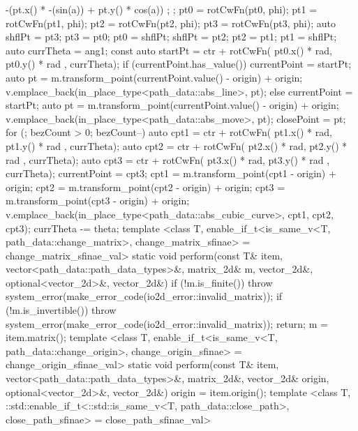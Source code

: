 \begin{codeblock}
{{{{{{              -(pt.x() * -(sin(a)) + pt.y() * cos(a)) };
          };
          pt0 = rotCwFn(pt0, phi);
          pt1 = rotCwFn(pt1, phi);
          pt2 = rotCwFn(pt2, phi);
          pt3 = rotCwFn(pt3, phi);
          auto shflPt = pt3;
          pt3 = pt0;
          pt0 = shflPt;
          shflPt = pt2;
          pt2 = pt1;
          pt1 = shflPt;
          auto currTheta = ang1;
          const auto startPt =
            ctr + rotCwFn({ pt0.x() * rad, pt0.y() * rad }, currTheta);
          if (currentPoint.has_value()) {
            currentPoint = startPt;
            auto pt = m.transform_point(currentPoint.value() - origin) + origin;
            v.emplace_back(in_place_type<path_data::abs_line>, pt);
          }
          else {
            currentPoint = startPt;
            auto pt = m.transform_point(currentPoint.value() - origin) + origin;
            v.emplace_back(in_place_type<path_data::abs_move>, pt);
            closePoint = pt;
          }
          for (; bezCount > 0; bezCount--) {
            auto cpt1 = ctr + rotCwFn({ pt1.x() * rad, pt1.y() * rad },
              currTheta);
            auto cpt2 = ctr + rotCwFn({ pt2.x() * rad, pt2.y() * rad },
              currTheta);
            auto cpt3 = ctr + rotCwFn({ pt3.x() * rad, pt3.y() * rad },
              currTheta);
            currentPoint = cpt3;
            cpt1 = m.transform_point(cpt1 - origin) + origin;
            cpt2 = m.transform_point(cpt2 - origin) + origin;
            cpt3 = m.transform_point(cpt3 - origin) + origin;
            v.emplace_back(in_place_type<path_data::abs_cubic_curve>, cpt1,
              cpt2, cpt3);
            currTheta -= theta;
          }
        }
      }
      template <class T, enable_if_t<is_same_v<T, path_data::change_matrix>, change_matrix_sfinae> = change_matrix_sfinae_val>
      static void perform(const T& item, vector<path_data::path_data_types>&, matrix_2d& m, vector_2d&, optional<vector_2d>&, vector_2d&) {
        if (!m.is_finite()) {
          throw system_error(make_error_code(io2d_error::invalid_matrix));
        }
        if (!m.is_invertible()) {
          throw system_error(make_error_code(io2d_error::invalid_matrix));
          return;
        }
        m = item.matrix();
      }
      template <class T, enable_if_t<is_same_v<T, path_data::change_origin>, change_origin_sfinae> = change_origin_sfinae_val>
      static void perform(const T& item, vector<path_data::path_data_types>&, matrix_2d&, vector_2d& origin, optional<vector_2d>&, vector_2d&) {
        origin = item.origin();
      }
      template <class T, ::std::enable_if_t<::std::is_same_v<T, path_data::close_path>, close_path_sfinae> = close_path_sfinae_val>
}}
\end{codeblock}
